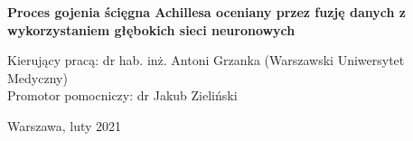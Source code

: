 \begin{onehalfspacing}
\begin{center}
{\large{
\textbf
{Proces gojenia ścięgna Achillesa oceniany przez fuzję danych z wykorzystaniem głębokich sieci neuronowych}} \\[2.3cm]



\normalsize{
\begin{flushleft}
Kierujący pracą:  dr hab. inż. Antoni Grzanka (Warszawski Uniwersytet Medyczny) \\
Promotor pomocniczy:  dr Jakub Zieliński \\
\end{flushleft} 

\vspace{1cm}
Warszawa, luty 2021}}
\end{center}
\end{onehalfspacing}

\singlespacing
\newpage
\thispagestyle{empty}
\mbox{}



\doublespacing
\newpage
\thispagestyle{empty}
\mbox{}

\setcounter{page}{0} \pagestyle{plain}

\tableofcontents



\pagestyle{fancy}